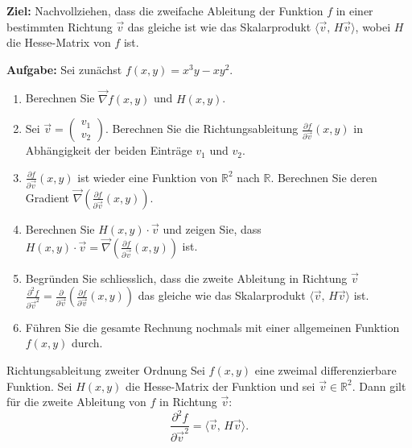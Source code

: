 \begin{LA}
	{}{}
	\textbf{Ziel:} Nachvollziehen, dass die zweifache Ableitung der Funktion \(f\) in einer bestimmten Richtung \(\vec{v}\) das gleiche ist wie das Skalarprodukt \(\langle \vec{v} ,\, H \vec{v} \rangle\), wobei \(H\) die Hesse-Matrix von \(f\) ist.

	\textbf{Aufgabe:} Sei zunächst \(f(x,y) = x^3y - xy^2\).
	\begin{enumerate}
		\item Berechnen Sie \(\vec{\nabla} f(x,y)\) und \(H(x,y)\).
		\item Sei \(\vec{v} = \begin{pmatrix} v_1 \\ v_2 \end{pmatrix}\). %
		      Berechnen Sie die Richtungsableitung \(\frac{\partial f}{\partial \vec{v}}(x, y)\) in Abhängigkeit der beiden Einträge \(v_1\) und \(v_2\).
		\item \(\frac{\partial f}{\partial \vec{v}}(x, y)\) ist wieder eine Funktion von \(\mathbb{R}^2\) nach \(\mathbb{R}\). Berechnen Sie deren Gradient \(\vec{\nabla}\left(\frac{\partial f}{\partial \vec{v}}(x, y)\right)\).
		\item Berechnen Sie \(H(x,y) \cdot \vec{v}\) und zeigen Sie, dass \(H(x,y) \cdot \vec{v} = \vec\nabla\left(\frac{\partial f}{\partial \vec{v}}(x, y)\right)\) ist.
		\item Begründen Sie schliesslich, dass die zweite Ableitung in Richtung $\vec{v}$ \(\frac{\partial^2 f}{\partial \vec{v}^2} = \frac{\partial }{\partial \vec{v}}\left(\frac{\partial f}{\partial \vec{v}}(x, y)\right)\) das gleiche wie das Skalarprodukt \(\langle \vec{v} ,\, H \vec{v} \rangle\) ist.
		\item Führen Sie die gesamte Rechnung nochmals mit einer allgemeinen Funktion \(f(x,y)\) durch.
	\end{enumerate}
\end{LA}


\clearpage

\begin{satz}
	{Richtungsableitung zweiter Ordnung}{}
	Sei \(f(x,y)\) eine zweimal differenzierbare Funktion. Sei \(H(x,y)\) die Hesse-Matrix der Funktion und sei \(\vec{v} \in \mathbb{R}^2\). Dann gilt für die zweite Ableitung von \(f\) in Richtung \(\vec{v}\):
	\[
		\frac{\partial^2 f}{\partial \vec{v}^2} = \langle \vec{v} ,\, H \vec{v} \rangle.
	\]
\end{satz}

